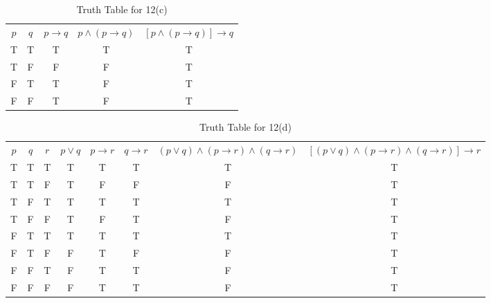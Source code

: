 \documentclass{Axon}
\begin{document}
\begin{table}[ht]
    \centering
    \begin{tabular}{c|c|c|c|c}
        \(p\) & \(q\) & \(p \to q\) & \(p \land (p \to q)\) & \([p \land (p \to q)] \to q\) \\
        T     & T     & T           & T                     & T                             \\
        T     & F     & F           & F                     & T                             \\
        F     & T     & T           & F                     & T                             \\
        F     & F     & T           & F                     & T
    \end{tabular}
    \caption{Truth Table for 12(c)}
\end{table}

\begin{table}[ht]
    \centering
    \begin{tabular}{c|c|c|c|c|c|c|c}
        \(p\) & \(q\) & \(r\) & \(p \lor q\) & \(p \to r\) & \(q \to r\) & \((p \lor q) \land (p \to r) \land (q \to r)\) & \([(p \lor q) \land (p \to r) \land (q \to r)] \to r\) \\
        T     & T     & T     & T            & T           & T           & T                                              & T                                                      \\
        T     & T     & F     & T            & F           & F           & F                                              & T                                                      \\
        T     & F     & T     & T            & T           & T           & T                                              & T                                                      \\
        T     & F     & F     & T            & F           & T           & F                                              & T                                                      \\
        F     & T     & T     & T            & T           & T           & T                                              & T                                                      \\
        F     & T     & F     & F            & T           & F           & F                                              & T                                                      \\
        F     & F     & T     & F            & T           & T           & F                                              & T                                                      \\
        F     & F     & F     & F            & T           & T           & F                                              & T
    \end{tabular}
    \caption{Truth Table for 12(d)}
\end{table}
\end{document}
